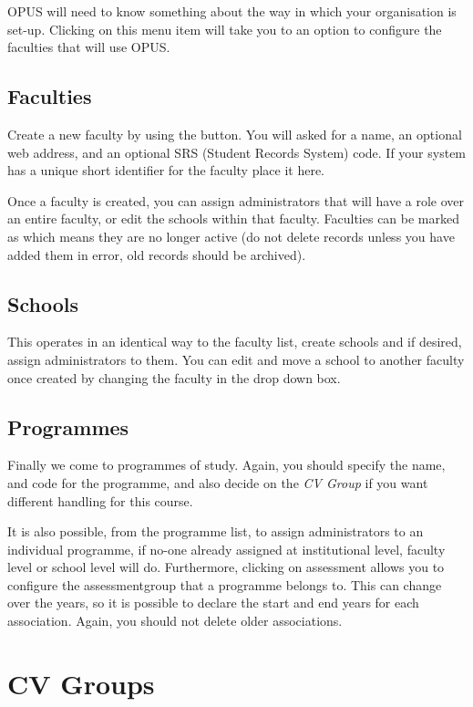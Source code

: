 \documentclass[12 pt]{book}
\begin{document}
OPUS will need to know something about the way in which your organisation is
set-up. Clicking on this menu item will take you to an option to configure the
faculties that will use OPUS.

\subsection{Faculties}

Create a new faculty by using the 
button. You will asked for a name, an optional web address, and an optional SRS
(Student Records System) code. If your system has a unique short identifier for
the faculty place it here.

Once a faculty is created, you can assign administrators that will have a role
over an entire faculty, or edit the schools within that faculty. Faculties can
be marked as  which means they are no longer active (do not
delete records unless you have added them in error, old records should be
archived).

\subsection{Schools}

This operates in an identical way to the faculty list, create schools and if
desired, assign administrators to them. You can edit and move a school to
another faculty once created by changing the faculty in the drop down box.

\subsection{Programmes}

Finally we come to programmes of study. Again, you should specify the name, and
code for the programme, and also decide on the \emph{CV Group} if you want
different handling for this course.

It is also possible, from the programme list, to assign administrators to an
individual programme, if no-one already assigned at institutional level,
faculty level or school level will do. Furthermore, clicking on assessment
allows you to configure the assessmentgroup that a programme belongs to. This
can change over the years, so it is possible to declare the start and end years
for each association. Again, you should not delete older associations.

\section{CV Groups}
\label{CVGroups}
\end{document}
